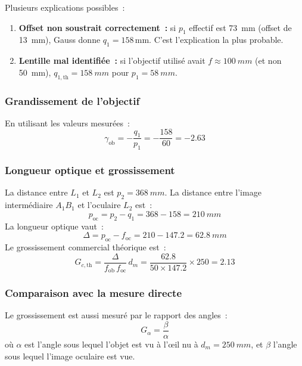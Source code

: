 ﻿\documentclass[a4paper, 11pt]{article}
\begin{document}
Plusieurs explications possibles~:
\begin{enumerate}
  \item \textbf{Offset non soustrait correctement~:} si $p_1$ effectif est \SI{73}{mm} (offset de \SI{13}{mm}), Gauss donne $q_1 = 158\,\mathrm{mm}$. C'est l'explication la plus probable.
  \item \textbf{Lentille mal identifiée~:} si l'objectif utilisé avait $f \approx \SI{100}{mm}$ (et non \SI{50}{mm}), $q_{1,\mathrm{th}} = \SI{158}{mm}$ pour $p_1 = \SI{58}{mm}$.
\end{enumerate}

\subsubsection{Grandissement de l'objectif}

En utilisant les valeurs mesurées~:
\begin{equation*}
  \gamma_\mathrm{ob} = -\frac{q_1}{p_1} = -\frac{158}{60} = -2.63
\end{equation*}

\subsubsection{Longueur optique et grossissement}

La distance entre $L_1$ et $L_2$ est $p_2 = \SI{368}{mm}$. La distance entre l'image intermédiaire $A_1B_1$ et l'oculaire $L_2$ est~:
\begin{equation*}
  p_\mathrm{oc} = p_2 - q_1 = 368 - 158 = \SI{210}{mm}
\end{equation*}
La longueur optique vaut~:
\begin{equation*}
  \Delta = p_\mathrm{oc} - f_\mathrm{oc} = 210 - 147.2 = \SI{62.8}{mm}
\end{equation*}
Le grossissement commercial théorique est~:
\begin{equation*}
  G_{c,\mathrm{th}} = \frac{\Delta}{f_\mathrm{ob}\,f_\mathrm{oc}}\,d_m = \frac{62.8}{50 \times 147.2}\times 250 = 2.13
\end{equation*}

\subsubsection{Comparaison avec la mesure directe}

Le grossissement est aussi mesuré par le rapport des angles~:
\begin{equation*}
  G_\alpha = \frac{\beta}{\alpha}
\end{equation*}
où $\alpha$ est l'angle sous lequel l'objet est vu à l'œil nu à $d_m = \SI{250}{mm}$, et $\beta$ l'angle sous lequel l'image oculaire est vue.
\end{document}
